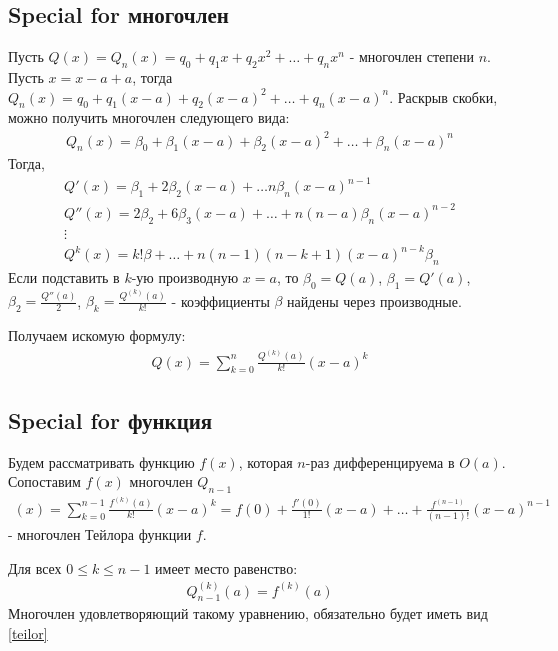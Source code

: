 \documentclass[10pt]{article}
\begin{document}
			\subsection{Special for многочлен}
			Пусть $Q(x) = Q_n(x) = q_0 + q_1x + q_2x^2 + \dots + q_nx^n$ - многочлен степени $n$. Пусть $x = x - a + a$, тогда $Q_n(x) = q_0 + q_1(x-a) + q_2(x-a)^2 + \dots + q_n(x-a)^n$.
			Раскрыв скобки, можно получить многочлен следующего вида:
			\begin{eqnarray}
				\nonumber	Q_n(x) = \beta_0 + \beta_1(x-a) + \beta_2(x-a)^2 + \dots + \beta_n(x-a)^n
			\end{eqnarray}
			Тогда,
			\begin{eqnarray}
				\nonumber Q'(x) = \beta_1 + 2\beta_2(x-a) + \dots n\beta_n(x-a)^{n-1} \\
				\nonumber Q'' (x) = 2\beta_2 + 6\beta_3(x-a) + \dots + n(n-a)\beta_n(x-a)^{n-2} \\
				\nonumber \vdots \\
				\nonumber Q^k(x) = k!\beta + \dots + n(n-1)(n-k + 1)(x-a)^{n-k}\beta_n
			\end{eqnarray}
			Если подставить в $k$-ую производную $x = a$, то $\beta_0 = Q(a)$, $\beta_1 = Q'(a)$, $\beta_2 = \frac{Q''(a)}{2}$, $\beta_k = \frac{Q^{(k)}(a)}{k!}$ - коэффициенты $\beta$ найдены через производные.
			
			Получаем искомую формулу:
			\begin{eqnarray}
				Q(x) = \sum\limits_{k=0}^{n} \frac{Q^{(k)}(a)}{k!}(x-a)^k \label{teilor}
			\end{eqnarray}
			
			\subsection{Special for функция}
			Будем рассматривать функцию $f(x)$, которая $n$-раз дифференцируема в $O(a)$. Сопоставим $f(x)$ многочлен $Q_{n-1}$ \begin{eqnarray}(x) = \sum\limits_{k=0}^{n-1} \frac{f^{(k)}(a)}{k!}(x-a)^k = f(0) + \frac{f'(0)}{1!}(x-a) + \dots + \frac{f^{(n-1)}}{(n-1)!}(x-a)^{n-1}\end{eqnarray} - многочлен Тейлора функции $f$.
	
			Для всех $ 0 \leq k \leq n-1$ имеет место равенство:	
			\begin{eqnarray}
				Q^{(k)}_{n-1}(a) = f^{(k)}(a)
			\end{eqnarray}
			Многочлен удовлетворяющий такому уравнению, обязательно будет иметь вид \ref{teilor}
			
\end{document}
